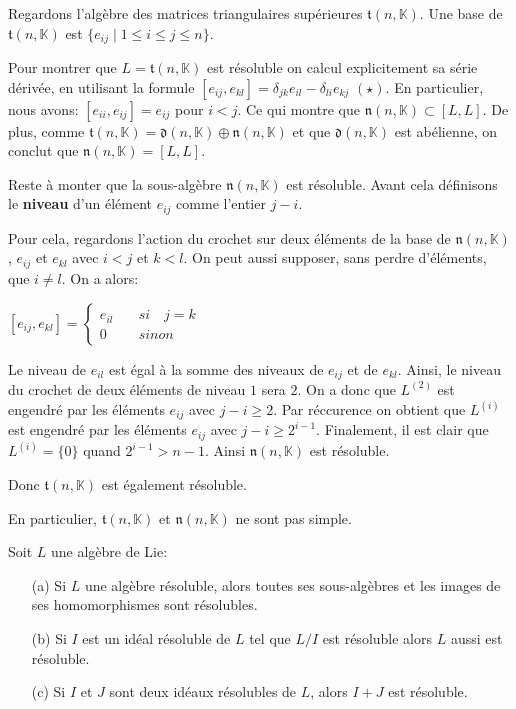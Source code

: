 \documentclass[a4paper,openany,12pt]{report}
\newcommand{\KK}{\mathbb{K}}
\newcommand{\ttt}{\mathfrak{t}}
\newcommand{\nn}{\mathfrak{n}}
\newcommand{\dd}{\mathfrak{d}}
\theoremstyle{break}
{\theorembodyfont{\upshape}
\newtheorem*{rmq}{Remarque :}
\newtheorem*{prv}{Preuve :}
\newtheorem*{ex}{Exemples :}
\newtheorem*{exe}{Exemple : }
\newtheorem*{nota}{Notation :}
\newtheorem*{dem}{D\'emonstration :}}
\begin{document}
\begin{exe}
\quad Regardons l'algèbre des matrices triangulaires supérieures $\ttt(n,\KK)$. Une base de $\ttt(n,\KK)$ est $\{ e_{ij} \mid 1\leq i \leq j\leq n \}$.

Pour montrer que $L = \ttt(n,\KK)$  est résoluble on calcul explicitement sa série dérivée, en utilisant la formule $ [ e_{ij},e_{kl} ]  = \delta_{jk}e_{il}  -  \delta_{li}e_{kj} $ $(\star)$. En particulier, nous avons:  $[ e_{ii},e_{ij} ]  = e_{ij}$ pour $i<j$. Ce qui montre que  $ \nn(n,\KK) \subset [L,L] $. De plus, comme $\ttt(n,\KK) = \dd(n,\KK) \oplus \nn(n,\KK)$ et que $\dd(n,\KK)$ est abélienne, on conclut que $ \nn(n,\KK) = [L,L]$.

Reste à monter que la sous-algèbre $\nn(n,\KK)$ est résoluble. Avant cela définisons le \textbf{niveau} d'un élément $e_{ij}$ comme l'entier $j-i$.

Pour cela, regardons l'action du crochet sur deux éléments de la base de $\nn(n,\KK)$, $e_{ij}$ et $e_{kl}$ avec $i<j$ et $k<l$. On peut aussi supposer, sans perdre d'éléments, que $i \neq l$. On a alors:
\begin{center}
$[e_{ij},e_{kl}] = \left \{
\begin{aligned}
e_{il} &\quad si \quad j = k \\
0 &\quad sinon
\end{aligned}
\right. $
\end{center}
Le niveau de $e_{il}$ est égal à la somme des niveaux de $e_{ij}$ et de $e_{kl}$. Ainsi, le niveau du crochet de deux éléments de niveau $1$ sera $2$. On a donc que $L^{(2)}$ est engendré par les éléments $e_{ij}$ avec $j-i \geq 2$. Par réccurence on obtient que $L^{(i)}$ est engendré par les éléments $e_{ij}$ avec $j-i \geq 2^{i-1}$. Finalement, il est clair que $L^{(i)} = \{0\}$ quand $2^{i-1} > n-1$. Ainsi $\nn(n, \KK)$ est résoluble. 

Donc $\ttt(n, \KK)$ est également résoluble. 

En particulier, $\ttt(n, \KK)$ et $\nn(n,\KK)$ ne sont pas simple.
\end{exe}

\begin{prop}\label{prop:solv}
Soit $L$ une algèbre de Lie: 
\begin{itemize}
\item[(a)] Si $L$ une algèbre résoluble, alors toutes ses sous-algèbres et les images de ses homomorphismes sont résolubles.
\item[(b)] Si $I$ est un idéal résoluble de $L$ tel que $L/I$ est résoluble alors $L$ aussi est résoluble.
\item[(c)] Si $I$ et $J$ sont deux idéaux résolubles de $L$, alors $I+J$ est résoluble.
\end{itemize}
\end{prop}
\end{document}
